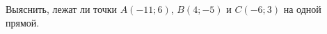 \begin{ex}
	\begin{condition}
		Выяснить, лежат ли точки \( A(-11;6) \), \( B(4;-5) \) и \( C(-6;3) \) на одной прямой.
	\end{condition}
\end{ex}